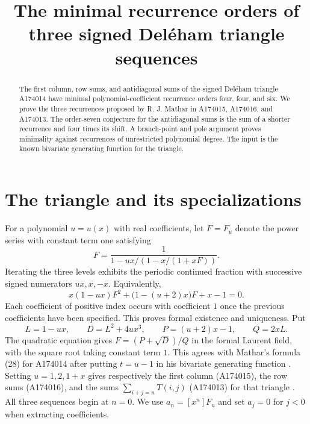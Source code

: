 \documentclass[11pt]{article}
\title{The minimal recurrence orders of three signed Del\'eham triangle sequences}
\author{}
\date{}
\begin{document}
\maketitle
\begin{abstract}
The first column, row sums, and antidiagonal sums of the signed Del\'eham triangle A174014 have minimal polynomial-coefficient recurrence orders four, four, and six. We prove the three recurrences proposed by R. J. Mathar in A174015, A174016, and A174013. The order-seven conjecture for the antidiagonal sums is the sum of a shorter recurrence and four times its shift. A branch-point and pole argument proves minimality against recurrences of unrestricted polynomial degree. The input is the known bivariate generating function for the triangle.
\end{abstract}

\section{The triangle and its specializations}
For a polynomial $u=u(x)$ with real coefficients, let $F=F_u$ denote the power series with constant term one satisfying
\[
 F=\frac{1}{1-ux/(1-x/(1+xF))}.
\]
Iterating the three levels exhibits the periodic continued fraction with successive signed numerators $ux,x,-x$. Equivalently,
\begin{equation}
 x(1-ux)F^2+\bigl(1-(u+2)x\bigr)F+x-1=0.\label{eq:quadratic}
\end{equation}
Each coefficient of positive index occurs with coefficient $1$ once the previous coefficients have been specified. This proves formal existence and uniqueness. Put
\[
 L=1-ux,\qquad D=L^2+4ux^3,\qquad P=(u+2)x-1,\qquad Q=2xL.
\]
The quadratic equation gives $F=(P+\sqrt D)/Q$ in the formal Laurent field, with the square root taking constant term $1$. This agrees with Mathar's formula (28) for A174014 after putting $t=u-1$ in his bivariate generating function \cite{delta}. Setting $u=1,2,1+x$ gives respectively the first column (A174015), the row sums (A174016), and the sums $\sum_{i+j=n}T(i,j)$ (A174013) for that triangle \cite{column,rows,diag}. All three sequences begin at $n=0$. We use $a_n=[x^n]F_u$ and set $a_j=0$ for $j<0$ when extracting coefficients.
\end{document}
